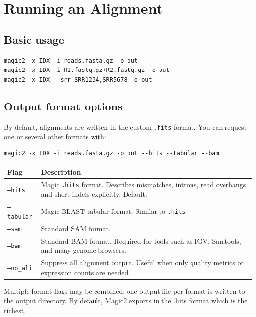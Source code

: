 \documentclass[11pt]{article}
\newcommand{\code}[1]{\texttt{#1}}
\begin{document}
\section{Running an Alignment}

\subsection{Basic usage}

\begin{lstlisting}
magic2 -x IDX -i reads.fasta.gz -o out
magic2 -x IDX -i R1.fastq.gz+R2.fastq.gz -o out
magic2 -x IDX --srr SRR1234,SRR5678 -o out
\end{lstlisting}

\subsection{Output format options}

By default, alignments are written in the custom \code{.hits} format.
You can request one or several other formats with:
\begin{lstlisting}
magic2 -x IDX -i reads.fasta.gz -o out --hits --tabular --bam
\end{lstlisting}

\begin{center}
\begin{tabular}{lp{10cm}}
\toprule
\textbf{Flag} & \textbf{Description} \\
\midrule
\code{--hits}    & Magic \code{.hits} format.  Describes mismatches,
                   introns, read overhangs, and short indels explicitly. Default. \\
\code{--tabular} & Magic-BLAST tabular format.  Similar to \code{.hits}\\
\code{--sam}     & Standard SAM format.  \\
\code{--bam}     & Standard BAM format.  Required for tools such as
                   IGV, Samtools, and many genome browsers.\\
\code{--no\_ali} & Suppress all alignment output.  Useful when only
                   quality metrics or expression counts are needed. \\
\bottomrule
\end{tabular}
\end{center}

Multiple format flags may be combined; one output file per format is
written to the output directory. By default, Magic2 exports in the
.hits format which is the richest.
\end{document}
